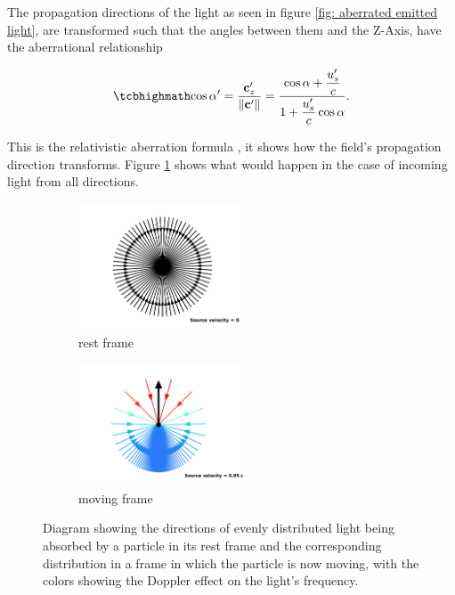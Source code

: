The propagation directions of the light as seen in figure \ref{fig: aberrated emitted light}, are transformed such that the angles between them and the Z-Axis, have the aberrational relationship

\begin{equation}
	\label{Cosine transform}
	\mhl{
		\cos\alpha' = \frac{\mathbf{c}'_z}{\|\mathbf{c}'\|} = \dfrac{\cos\alpha + \dfrac{u'_s}{c}}{1+\dfrac{u'_s}{c}\cos\alpha}.
	}
\end{equation}

This is the relativistic aberration formula \cite{einstein1905electrodynamics}, it shows how the field's propagation direction transforms. Figure \ref{fig: aberrated absorbed light} shows what would happen in the case of incoming light from all directions.

\begin{figure}[ht]
	\begin{subfigure}{.49\textwidth}
		\centering
		\includegraphics[width=5cm]{images/pdf/Aberrated_velocities_inwards_restframe.pdf}
		\caption{rest frame}
	\end{subfigure}
	\begin{subfigure}{.49\textwidth}
		\centering
		\includegraphics[width=5cm]{images/pdf/Aberrated_velocities_inwards.pdf}
		\caption{moving frame}
	\end{subfigure}
	\caption{Diagram showing the directions of evenly distributed light being absorbed by a particle in its rest frame and the corresponding distribution in a frame in which the particle is now moving, with the colors showing the Doppler effect on the light's frequency.}
	\label{fig: aberrated absorbed light}
\end{figure}

